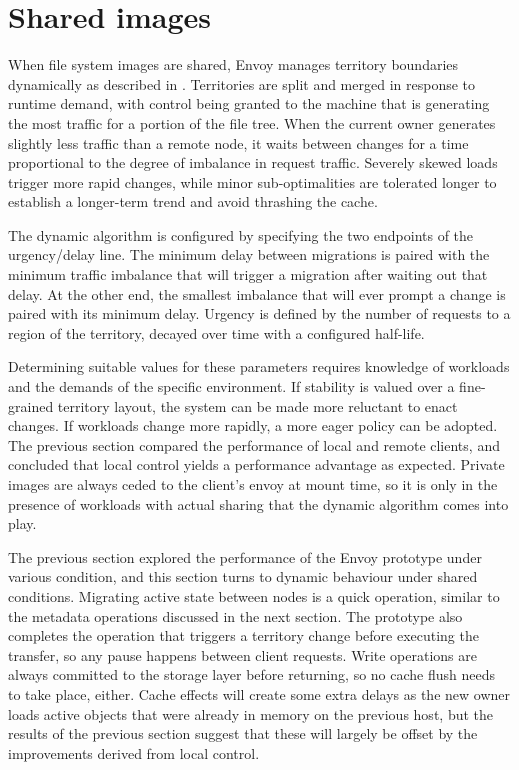 \section{Shared images}\label{sec:shared-images}

When file system images are shared, Envoy manages territory boundaries dynamically as described in . Territories are split and merged in response to runtime demand, with control being granted to the machine that is generating the most traffic for a portion of the file tree. When the current owner generates slightly less traffic than a remote node, it waits between changes for a time proportional to the degree of imbalance in request traffic. Severely skewed loads trigger more rapid changes, while minor sub-optimalities are tolerated longer to establish a longer-term trend and avoid thrashing the cache.

The dynamic algorithm is configured by specifying the two endpoints of the urgency/delay line. The minimum delay between migrations is paired with the minimum traffic imbalance that will trigger a migration after waiting out that delay. At the other end, the smallest imbalance that will ever prompt a change is paired with its minimum delay. Urgency is defined by the number of requests to a region of the territory, decayed over time with a configured half-life.

Determining suitable values for these parameters requires knowledge of workloads and the demands of the specific environment. If stability is valued over a fine-grained territory layout, the system can be made more reluctant to enact changes. If workloads change more rapidly, a more eager policy can be adopted. The previous section compared the performance of local and remote clients, and concluded that local control yields a performance advantage as expected. Private images are always ceded to the client's envoy at mount time, so it is only in the presence of workloads with actual sharing that the dynamic algorithm comes into play.

The previous section explored the performance of the Envoy prototype under various condition, and this section turns to dynamic behaviour under shared conditions. Migrating active state between nodes is a quick operation, similar to the metadata operations discussed in the next section. The prototype also completes the operation that triggers a territory change before executing the transfer, so any pause happens between client requests. Write operations are always committed to the storage layer before returning, so no cache flush needs to take place, either. Cache effects will create some extra delays as the new owner loads active objects that were already in memory on the previous host, but the results of the previous section suggest that these will largely be offset by the improvements derived from local control.

